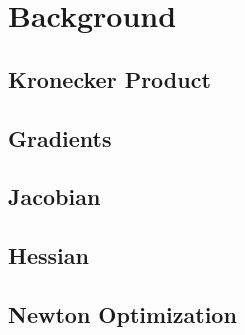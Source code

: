\section{Background}

\subsection{Kronecker Product}
\subsection{Gradients}
\subsection{Jacobian}
\subsection{Hessian}
\subsection{Newton Optimization}
